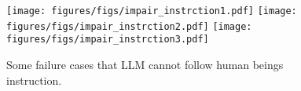 \begin{figure*}[t]
\centering
\texttt{[image: figures/figs/impair\_instrction1.pdf]}  
\texttt{[image: figures/figs/impair\_instrction2.pdf]}  
\texttt{[image: figures/figs/impair\_instrction3.pdf]}  
\vspace{-10pt}
\caption{Some failure cases that LLM cannot follow human beings instruction.}
\label{fig:impair_inst}
\end{figure*}